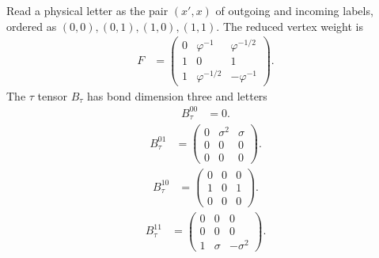 \begin{definition}
    \label{def:asymex_fib}
    \leanok
    Read a physical letter as the pair $(x',x)$ of outgoing and incoming
    labels, ordered as $(0,0),(0,1),(1,0),(1,1)$. The reduced vertex
    weight is
    \begin{align}
        F & =\begin{pmatrix}
                 0 & \varphi^{-1}   & \varphi^{-1/2} \\
                 1 & 0              & 1              \\
                 1 & \varphi^{-1/2} & -\varphi^{-1}
             \end{pmatrix}.
        \label{eq:asymex_fib_vertex}
    \end{align}
    The $\tau$ tensor $B_\tau$ has bond dimension three and letters
    \begin{align}
        B_\tau^{00} & =0.
        \label{eq:asymex_fib_tau_zero}
    \end{align}
    \begin{align}
        B_\tau^{01} & =\begin{pmatrix}
                           0 & \sigma^2 & \sigma \\0&0&0\\0&0&0
                       \end{pmatrix}.
        \label{eq:asymex_fib_tau_01}
    \end{align}
    \begin{align}
        B_\tau^{10} & =\begin{pmatrix}
                           0 & 0 & 0 \\1&0&1\\0&0&0
                       \end{pmatrix}.
        \label{eq:asymex_fib_tau_10}
    \end{align}
    \begin{align}
        B_\tau^{11} & =\begin{pmatrix}
                           0 & 0 & 0 \\0&0&0\\1&\sigma&-\sigma^2
                       \end{pmatrix}.
        \label{eq:asymex_fib_tau_11}
    \end{align}

\end{definition}

